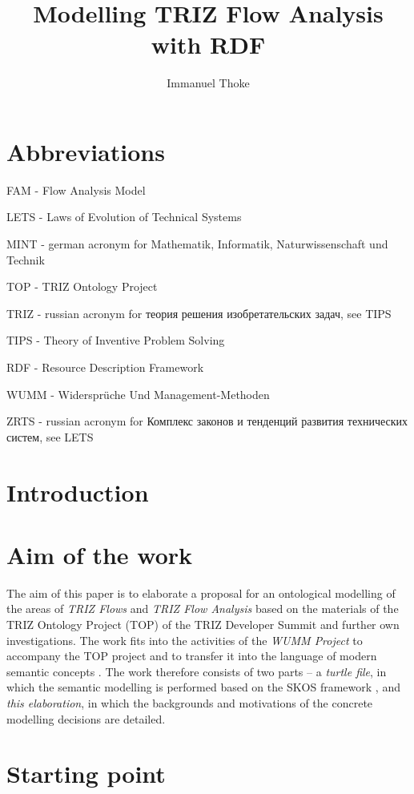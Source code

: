 \documentclass[a4paper,11pt]{article}
\author{Immanuel Thoke}
\title{Modelling TRIZ Flow Analysis with RDF}
\begin{document}
    \maketitle
    \tableofcontents
    \section{Abbreviations}
    FAM - Flow Analysis Model

    LETS - Laws of Evolution of Technical Systems

    MINT - german acronym for Mathematik, Informatik, Naturwissenschaft und Technik

    TOP - TRIZ Ontology Project

    TRIZ - russian acronym for \foreignlanguage{russian}{теория решения изобретательских задач}, see TIPS

    TIPS - Theory of Inventive Problem Solving 

    RDF - Resource Description Framework 

    WUMM - Widersprüche Und Management-Methoden

    ZRTS - russian acronym for \foreignlanguage{russian}{Комплекс законов и тенденций развития технических систем}, see LETS

    \section{Introduction}

    \section{Aim of the work}

    The aim of this paper is to elaborate a proposal for an ontological modelling
    of the areas of \emph{TRIZ Flows} and \emph{TRIZ Flow Analysis} based on the
    materials of the TRIZ Ontology Project (TOP) of the TRIZ Developer Summit
    \cite{TOP} and further own investigations. The work fits into the activities
    of the \emph{WUMM Project} \cite{WUMM} to accompany the TOP project and to
    transfer it into the language of modern semantic concepts
    \cite{WUMM-Ontology}.  The work therefore consists of two parts -- a
    \emph{turtle file}, in which the semantic modelling is performed based on the
    SKOS framework \cite{SKOS}, and \emph{this elaboration}, in which the
    backgrounds and motivations of the concrete modelling decisions are detailed.

    \section{Starting point} 
\end{document}
